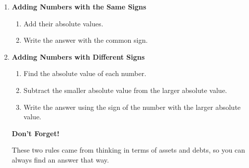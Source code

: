 \documentclass{ximera}
\begin{document}
\normalsize
\begin{enumerate}
\item \textbf{Adding Numbers with the Same Signs}

\begin{enumerate}
\item Add their absolute values.

\item Write the answer with the common sign.

\end{enumerate}


\item \textbf{Adding Numbers with Different Signs}

\begin{enumerate}
\item Find the absolute value of each number.

\item Subtract the smaller absolute value from the larger absolute value.

\item Write the answer using the sign of the number with the larger absolute value.

\end{enumerate}



\textbf{Don't Forget!}

These two rules came from thinking in terms of assets and debts, so you can always find an answer that way.

\end{enumerate}
\end{document}
